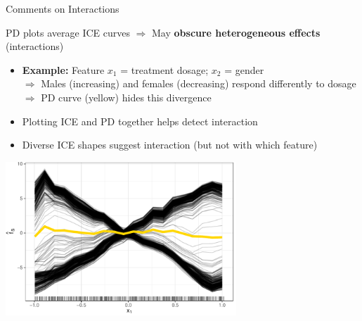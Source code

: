 \documentclass[11pt,compress,t,notes=noshow, aspectratio=169, xcolor=table]{beamer}
\begin{document}
\begin{frame}{Comments on Interactions}

PD plots average ICE curves \(\Rightarrow\) May \textbf{obscure heterogeneous effects} (interactions)
    \begin{itemize}
      \item \textbf{Example:} Feature $x_1$ = treatment dosage; $x_2$ = gender \\
      \(\Rightarrow\)  Males (increasing) and females (decreasing) respond differently to dosage\\
      \(\Rightarrow\)  PD curve (yellow) hides this divergence
      \item Plotting ICE and PD together helps detect interaction
      \item Diverse ICE shapes suggest interaction  (but not with which feature)
    \end{itemize}
    
\begin{center}\includegraphics[width=0.65\textwidth]{figure/pdp_xor.pdf} \end{center}



\end{frame}
\end{document}
